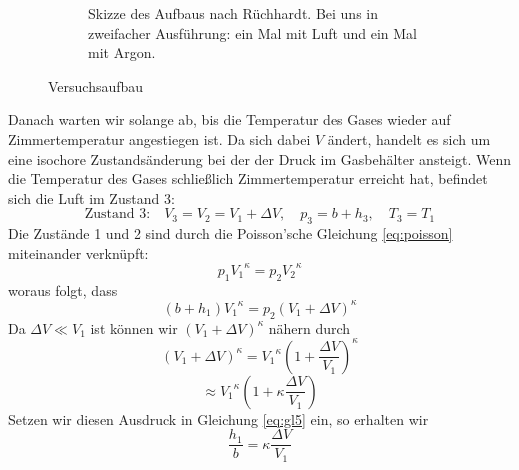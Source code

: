 \documentclass[a4paper,10pt]{article}
\begin{document}
\begin{figure}[htb]
\begin{subfigure}{0.48\textwidth}
 \caption{Skizze des Aufbaus nach Rüchhardt. Bei uns in zweifacher Ausführung: ein Mal mit Luft und ein Mal mit Argon.}
\label{fig:aufbau2}
  \end{subfigure}
 \caption[Versuchsaufbau]{Versuchsaufbau\footnotemark}
\end{figure}

Danach warten wir  solange ab, bis die Temperatur des Gases wieder auf Zimmertemperatur angestiegen ist. Da sich dabei \(V\) ändert, handelt es sich um eine isochore Zustandsänderung bei der der Druck im Gasbehälter ansteigt. Wenn die Temperatur des Gases schließlich Zimmertemperatur erreicht hat, befindet sich die Luft im Zustand 3:
\begin{equation}
  \text{Zustand 3:}\quad V_3=V_2= V_1+ \Delta V,\quad p_3=b+h_3, \quad T_3=T_1
\end{equation}
Die Zustände 1 und 2 sind durch die Poisson'sche Gleichung \eqref{eq:poisson} miteinander verknüpft:
\begin{equation}
  p_1{V_1}^{\kappa}=p_2{V_2}^{\kappa}
\end{equation}
woraus folgt, dass
\begin{equation} \label{eq:gl5}
  \left(b+h_1\right){V_1}^{\kappa}=p_2{\left(V_1+\Delta V\right)}^{\kappa}
\end{equation}
Da \(\Delta V \ll V_1\) ist können wir \(\left(V_1 + \Delta V \right)^{\kappa}\) nähern durch
\begin{equation*}
  \left(V_1 + \Delta V \right)^{\kappa} = {V_1}^{\kappa} \left(1+ \frac{\Delta V}{V_1}\right)^{\kappa} 
\end{equation*}
\begin{equation} 
  \approx  {V_1}^{\kappa} \left(1+{\kappa} \frac{\Delta V}{V_1}\right)
\end{equation}
Setzen wir diesen Ausdruck in Gleichung \eqref{eq:gl5} ein, so erhalten wir
\begin{equation} \label{eq:gl7}
  \frac{h_1}{b} = \kappa \frac{\Delta V}{V_1}
\end{equation}
\end{document}
